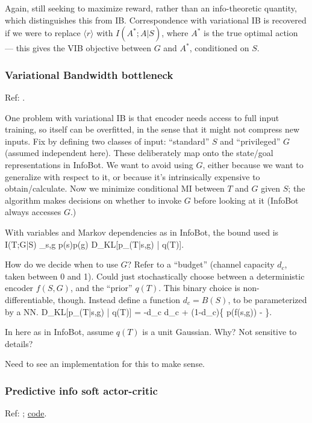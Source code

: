 \documentclass[notitlepage,openany,11pt]{report}
\numberwithin{equation}{section}
\theoremstyle{plain}%
\begin{document}
Again, still seeking to maximize reward, rather than an info-theoretic quantity, which distinguishes this from IB. Correspondence with variational IB is recovered if we were to replace $\langle r \rangle$ with $I(A^\ast; A|S)$, where $A^\ast$ is the true optimal action --- this gives the VIB objective between $G$ and $A^\ast$, conditioned on $S$. 


\subsubsection{Variational Bandwidth bottleneck} 
Ref: \cite{GoyalEtAl:19a}.

One problem with variational IB is that encoder needs access to full input training, so itself can be overfitted, in the sense that it might not compress new inputs. Fix by defining two classes of input: ``standard'' $S$ and ``privileged'' $G$ (assumed independent here). These deliberately map onto the state/goal representations in InfoBot. We want to avoid using $G$, either because we want to generalize with respect to it, or because it's intrinsically expensive to obtain/calculate. Now we minimize conditional MI between $T$ and $G$ given $S$; the algorithm makes decisions on whether to invoke $G$ before looking at it (InfoBot always accesses $G$.)

With variables and Markov dependencies as in InfoBot, the bound used is
\be
I(T;G|S) \leq \sum_{s,g} p(s)p(g) D_{KL}[p_{}(T|s,g) | q(T)].
\ee

How do we decide when to use $G$? Refer to a ``budget'' (channel capacity $d_c$, taken between 0 and 1). Could just stochastically choose between a deterministic encoder $f(S,G)$, and the ``prior'' $q(T)$. This binary choice is non-differentiable, though. Instead define a function $d_c = B(S)$, to be parameterized by a NN. 
\be
D_{KL}[p_{}(T|s,g) | q(T)] = -d_c \log d_c + (1-d_c)\left\{ \log p(f(s,g)) - \log [d_c p(f(s,g)) + (1-d_c)] \right\}.
\ee

In here as in InfoBot, assume $q(T)$ is a unit Gaussian. Why? Not sensitive to details?

Need to see an implementation for this to make sense.



\subsubsection{Predictive info soft actor-critic}
Ref: \cite{LeeEtAl:20}; \href{https://github.com/google-research/pisac}{code}.
\end{document}
